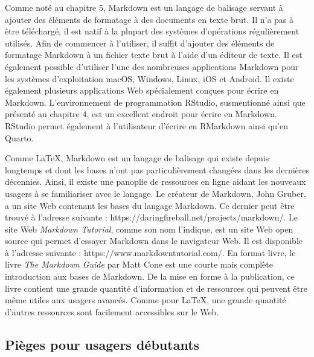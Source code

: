 \documentclass[
  letterpaper,
  DIV=11,
  numbers=noendperiod]{scrreprt}
\begin{document}
Comme noté au chapitre 5, Markdown est un langage de balisage servant à
ajouter des éléments de formatage à des documents en texte brut. Il n'a
pas à être téléchargé, il est natif à la plupart des systèmes
d'opérations régulièrement utilisés. Afin de commencer à l'utiliser, il
suffit d'ajouter des éléments de formatage Markdown à un fichier texte
brut à l'aide d'un éditeur de texte. Il est également possible
d'utiliser l'une des nombreuses applications Markdown pour les systèmes
d'exploitation macOS, Windows, Linux, iOS et Android. Il existe
également plusieurs applications Web spécialement conçues pour écrire en
Markdown. L'environnement de programmation RStudio, susmentionné ainsi
que présenté au chapitre 4, est un excellent endroit pour écrire en
Markdown. RStudio permet également à l'utilisateur d'écrire en RMarkdown
ainsi qu'en Quarto.

Comme \LaTeX, Markdown est un langage de balisage qui existe depuis
longtemps et dont les bases n'ont pas particulièrement changées dans les
dernières décennies. Ainsi, il existe une panoplie de ressources en
ligne aidant les nouveaux usagers à se familiariser avec le langage. Le
créateur de Markdown, John Gruber, a un site Web contenant les bases du
langage Markdown. Ce dernier peut être trouvé à l'adresse suivante :
https://daringfireball.net/projects/markdown/. Le site Web
\emph{Markdown Tutorial}, comme son nom l'indique, est un site Web open
source qui permet d'essayer Markdown dans le navigateur Web. Il est
disponible à l'adresse suivante : https://www.markdowntutorial.com/. En
format livre, le livre \emph{The Markdown Guide} par Matt Cone est une
courte mais complète introduction aux bases de Markdown. De la mise en
forme à la publication, ce livre contient une grande quantité
d'information et de ressources qui peuvent être même utiles aux usagers
avancés. Comme pour \LaTeX, une grande quantité d'autres ressources sont
facilement accessibles sur le Web.

\hypertarget{piuxe8ges-pour-usagers-duxe9butants}{%
\subsection{Pièges pour usagers
débutants}\label{piuxe8ges-pour-usagers-duxe9butants}}
\end{document}
